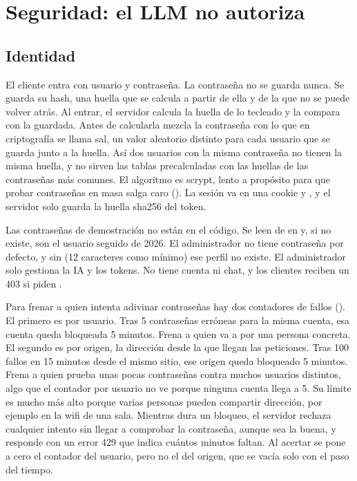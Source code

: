 \section{Seguridad: el LLM no autoriza}\label{sec:seguridad}

\subsection{Identidad}\label{sec:identidad}

El cliente entra con usuario y contraseña. La contraseña no se guarda nunca. Se guarda su hash, una huella que se
calcula a partir de ella y de la que no se puede volver atrás. Al entrar, el servidor calcula la huella de lo tecleado
y la compara con la guardada. Antes de calcularla mezcla la contraseña con lo que en criptografía se llama sal, un valor aleatorio
distinto para cada usuario que se guarda junto a la huella. Así dos usuarios con la misma contraseña no tienen la misma huella, y no sirven las tablas
precalculadas con las huellas de las contraseñas más comunes. El algoritmo es scrypt, lento a propósito para que
probar contraseñas en masa salga caro (). La sesión va en una cookie  y , y el servidor
solo guarda la huella sha256 del token.

Las contraseñas de demostración no están en el código. Se leen de  en  y, si no
existe, son el usuario seguido de 2026. El administrador no tiene contraseña por defecto, y sin 
(12 caracteres como mínimo) ese perfil no existe. El administrador solo gestiona la IA y los tokens. No tiene cuenta ni
chat, y los clientes reciben un 403 si piden .

Para frenar a quien intenta adivinar contraseñas hay dos contadores de fallos (). El
primero es por usuario. Tras 5 contraseñas erróneas para la misma cuenta, esa cuenta queda bloqueada 5 minutos. Frena
a quien va a por una persona concreta. El segundo es por origen, la dirección desde la que llegan las peticiones. Tras
100 fallos en 15 minutos desde el mismo sitio, ese origen queda bloqueado 5 minutos. Frena a quien prueba unas pocas
contraseñas contra muchos usuarios distintos, algo que el contador por usuario no ve porque ninguna cuenta llega a 5.
Su límite es mucho más alto porque varias personas pueden compartir dirección, por ejemplo en la wifi de una sala.
Mientras dura un bloqueo, el servidor rechaza cualquier intento sin llegar a comprobar la contraseña, aunque sea la
buena, y responde con un error 429 que indica cuántos minutos faltan. Al acertar se pone a cero el contador del
usuario, pero no el del origen, que se vacía solo con el paso del tiempo.

